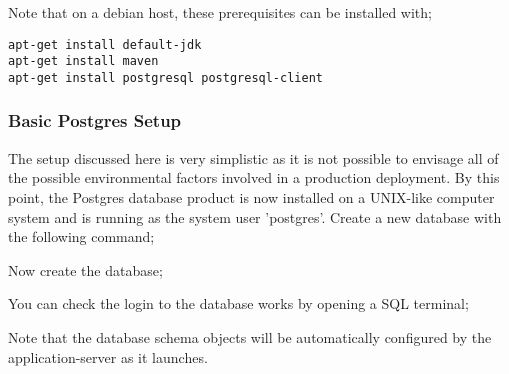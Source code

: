 Note that on a debian host, these prerequisites can be installed with;

\begin{verbatim}
apt-get install default-jdk
apt-get install maven
apt-get install postgresql postgresql-client
\end{verbatim}

\subsubsection{Basic Postgres Setup}

The setup discussed here is very simplistic as it is not possible to envisage all of the possible environmental factors involved in a production deployment.  By this point, the Postgres database product is now installed on a UNIX-like computer system and is running as the system user 'postgres'.  Create a new database with the following command;


Now create the database;


You can check the login to the database works by opening a SQL terminal;


Note that the database schema objects will be automatically configured by the application-server as it launches.

